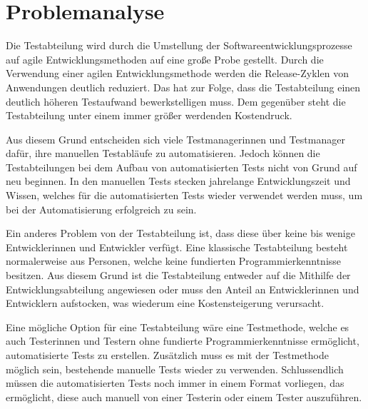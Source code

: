 \chapter{Problemanalyse}
\label{cha:Problemanalyse}

Die Testabteilung wird durch die Umstellung der Softwareentwicklungsprozesse auf agile Entwicklungsmethoden auf eine große Probe gestellt. Durch die Verwendung einer agilen Entwicklungsmethode werden die Release-Zyklen von Anwendungen deutlich reduziert. Das hat zur Folge, dass die Testabteilung einen deutlich höheren Testaufwand bewerkstelligen muss. Dem gegenüber steht die Testabteilung unter einem immer größer werdenden Kostendruck. 

\SuperPar
Aus diesem Grund entscheiden sich viele Testmanagerinnen und Testmanager dafür, ihre manuellen Testabläufe zu automatisieren. Jedoch können die Testabteilungen bei dem Aufbau von automatisierten Tests nicht von Grund auf neu beginnen. In den manuellen Tests stecken jahrelange Entwicklungszeit und Wissen, welches für die automatisierten Tests wieder verwendet werden muss, um bei der Automatisierung erfolgreich zu sein. 

\SuperPar
Ein anderes Problem von der Testabteilung ist, dass diese über keine bis wenige Entwicklerinnen und Entwickler verfügt. Eine klassische Testabteilung besteht normalerweise aus Personen, welche keine fundierten Programmierkenntnisse besitzen. Aus diesem Grund ist die Testabteilung entweder auf die Mithilfe der Entwicklungsabteilung angewiesen oder muss den Anteil an Entwicklerinnen und Entwicklern aufstocken, was wiederum eine Kostensteigerung verursacht.

\SuperPar
Eine mögliche Option für eine Testabteilung wäre eine Testmethode, welche es auch Testerinnen und Testern ohne fundierte Programmierkenntnisse ermöglicht, automatisierte Tests zu erstellen. Zusätzlich muss es mit der Testmethode möglich sein, bestehende manuelle Tests wieder zu verwenden. Schlussendlich müssen die automatisierten Tests noch immer in einem Format vorliegen, das ermöglicht, diese auch manuell von einer Testerin oder einem Tester auszuführen.